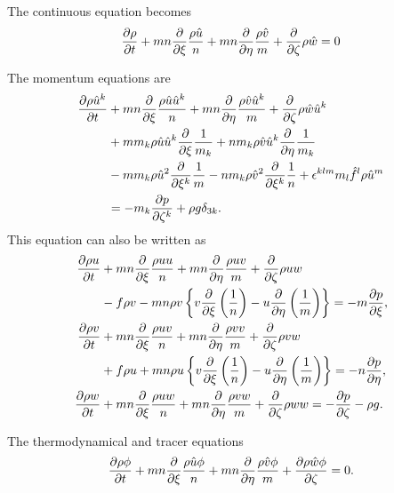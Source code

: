 The continuous equation becomes
\begin{equation}
  \frac{\partial \rho}{\partial t} + mn\frac{\partial }{\partial \xi}\frac{\rho \hat{u}}{n} + mn\frac{\partial }{\partial \eta}\frac{\rho \hat{v}}{m} + \frac{\partial }{\partial \zeta}\rho \hat{w} = 0
\end{equation}

The momentum equations are
\begin{align}
  \frac{\partial \rho\hat{u}^k}{\partial t}
  &+ mn\frac{\partial }{\partial \xi}\frac{\rho \hat{u} \hat{u}^k}{n}
   + mn\frac{\partial }{\partial \eta}\frac{\rho \hat{v} \hat{u}^k}{m}
   + \frac{\partial }{\partial \zeta}\rho \hat{w} \hat{u}^k                     \nonumber \\
  &+ m m_k \rho \hat{u} \hat{u}^k \frac{\partial }{\partial \xi}\frac{1}{m_k}
   + n m_k \rho \hat{v} \hat{u}^k \frac{\partial }{\partial \eta}\frac{1}{m_k}  \nonumber \\
  &- m m_k \rho \hat{u}^2 \frac{\partial }{\partial \xi^k}\frac{1}{m}
   - n m_k \rho \hat{v}^2 \frac{\partial }{\partial \xi^k}\frac{1}{n}
   + \epsilon^{klm} m_l \hat{f}^l \rho \hat{u}^m        \nonumber \\
  &= -m_k \frac{\partial p}{\partial \zeta^k} + \rho g \delta_{3k}.
\end{align}
This equation can also be written as 
\begin{align}
  \frac{\partial \rho u}{\partial t} &+ mn\frac{\partial }{\partial \xi}\frac{\rho uu}{n} + mn\frac{\partial }{\partial \eta}\frac{\rho uv}{m} + \frac{\partial }{\partial \zeta}\rho uw  \nonumber \\
  &- f\rho v
   - mn \rho v\left\{v\frac{\partial }{\partial \xi}\left(\frac{1}{n}\right) - u\frac{\partial }{\partial \eta}\left(\frac{1}{m}\right)\right\}
   = -m\frac{\partial p}{\partial \xi}, \\
  \frac{\partial \rho v}{\partial t} &+ mn\frac{\partial }{\partial \xi}\frac{\rho uv}{n} + mn\frac{\partial }{\partial \eta}\frac{\rho vv}{m} + \frac{\partial }{\partial \zeta}\rho vw \nonumber \\
  &+ f\rho u
   + mn \rho u\left\{v\frac{\partial }{\partial \xi}\left(\frac{1}{n}\right) - u\frac{\partial }{\partial \eta}\left(\frac{1}{m}\right)\right\}
   = -n\frac{\partial p}{\partial \eta}, \\
  \frac{\partial \rho w}{\partial t} &+ mn\frac{\partial }{\partial \xi}\frac{\rho uw}{n} + mn\frac{\partial }{\partial \eta}\frac{\rho vw}{m} + \frac{\partial }{\partial \zeta}\rho ww = -\frac{\partial p}{\partial \zeta} -\rho g.
\end{align}

The thermodynamical and tracer equations
\begin{equation}
  \frac{\partial \rho \phi}{\partial t} + mn\frac{\partial }{\partial \xi}\frac{\rho \hat{u}\phi}{n} + mn\frac{\partial }{\partial \eta}\frac{\rho \hat{v}\phi}{m} + \frac{\partial \rho \hat{w}\phi}{\partial \zeta} = 0.
\end{equation}


%
